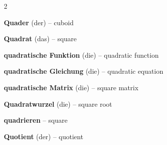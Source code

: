 \begin{multicols}{2}
\par\nopagebreak
\textbf{Quader} (der) -- cuboid\dotfill\hyperref[e:227]{\pageref*{e:227}}\par
\textbf{Quadrat} (das) -- square\dotfill\hyperref[e:198]{\pageref*{e:198}}\par
\textbf{quadratische Funktion} (die) -- quadratic function\dotfill\hyperref[e:124]{\pageref*{e:124}}\par
\textbf{quadratische Gleichung} (die) -- quadratic equation\dotfill\hyperref[e:82]{\pageref*{e:82}}\par
\textbf{quadratische Matrix} (die) -- square matrix\dotfill\hyperref[e:321]{\pageref*{e:321}}\par
\textbf{Quadratwurzel} (die) -- square root\dotfill\hyperref[e:45]{\pageref*{e:45}}\par
\textbf{quadrieren} -- square\dotfill\hyperref[e:51]{\pageref*{e:51}}\par
\textbf{Quotient} (der) -- quotient\dotfill\hyperref[e:25]{\pageref*{e:25}}\par


\end{multicols}
